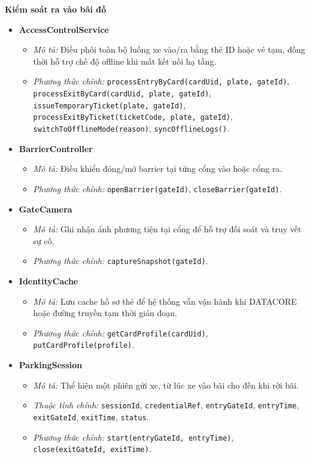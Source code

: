 \noindent\textbf{Kiểm soát ra vào bãi đỗ}
\begin{itemize}[leftmargin=1.5cm]
    \item \textbf{AccessControlService}
    \begin{itemize}
        \item \textit{Mô tả:} Điều phối toàn bộ luồng xe vào/ra bằng thẻ ID hoặc vé tạm, đồng thời hỗ trợ chế độ offline khi mất kết nối hạ tầng.
        \item \textit{Phương thức chính:} \texttt{processEntryByCard(cardUid, plate, gateId)}, \texttt{processExitByCard(cardUid, plate, gateId)}, \texttt{issueTemporaryTicket(plate, gateId)}, \texttt{processExitByTicket(ticketCode, plate, gateId)}, \texttt{switchToOfflineMode(reason)}, \texttt{syncOfflineLogs()}.
    \end{itemize}

    \item \textbf{BarrierController}
    \begin{itemize}
        \item \textit{Mô tả:} Điều khiển đóng/mở barrier tại từng cổng vào hoặc cổng ra.
        \item \textit{Phương thức chính:} \texttt{openBarrier(gateId)}, \texttt{closeBarrier(gateId)}.
    \end{itemize}

    \item \textbf{GateCamera}
    \begin{itemize}
        \item \textit{Mô tả:} Ghi nhận ảnh phương tiện tại cổng để hỗ trợ đối soát và truy vết sự cố.
        \item \textit{Phương thức chính:} \texttt{captureSnapshot(gateId)}.
    \end{itemize}

    \item \textbf{IdentityCache}
    \begin{itemize}
        \item \textit{Mô tả:} Lưu cache hồ sơ thẻ để hệ thống vẫn vận hành khi DATACORE hoặc đường truyền tạm thời gián đoạn.
        \item \textit{Phương thức chính:} \texttt{getCardProfile(cardUid)}, \texttt{putCardProfile(profile)}.
    \end{itemize}

    \item \textbf{ParkingSession}
    \begin{itemize}
        \item \textit{Mô tả:} Thể hiện một phiên gửi xe, từ lúc xe vào bãi cho đến khi rời bãi.
        \item \textit{Thuộc tính chính:} \texttt{sessionId}, \texttt{credentialRef}, \texttt{entryGateId}, \texttt{entryTime}, \texttt{exitGateId}, \texttt{exitTime}, \texttt{status}.
        \item \textit{Phương thức chính:} \texttt{start(entryGateId, entryTime)}, \texttt{close(exitGateId, exitTime)}.
    \end{itemize}


\end{itemize}

